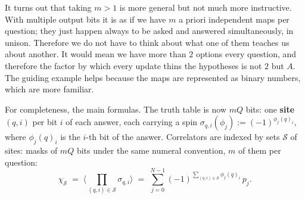 \documentclass[11pt]{article}
\begin{document}
It turns out that taking $m > 1$ is more
general but not much more instructive. With multiple output bits it
is as if we have $m$ a priori independent maps per question; they
just happen always to be asked and answered simultaneously, in
unison. Therefore we do not have to think about what one of them
teaches us about another. It would mean we have more than $2$
options every question, and therefore the factor by which every
update thins the hypotheses is not $2$ but $A$. The guiding
example helps because the maps are represented as binary numbers,
which are more familiar.

For completeness, the main formulas. The truth table is now
$mQ$ bits: one \textbf{site} $(q, i)$ per bit $i$ of each
answer, each carrying a spin
$\sigma_{q,i}(\phi_j) := (-1)^{\phi_j(q)_i}$, where $\phi_j(q)_i$
is the $i$-th bit of the answer. Correlators are indexed by sets
$\mathcal S$ of sites: masks of $mQ$ bits under the same numeral
convention, $m$ of them per question:
\begin{equation}\label{eq:wht-m}
  \chi_{\mathcal S} \;=\; \Big\langle \prod_{(q,i) \in \mathcal S} \sigma_{q,i}
  \Big\rangle
  \;=\; \sum_{j=0}^{N-1} (-1)^{\sum_{(q,i) \in \mathcal S} \phi_j(q)_i}\,
  p_j.
\end{equation}
\end{document}
